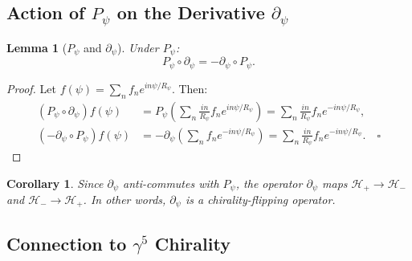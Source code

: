 \documentclass[12pt,a4paper]{article}
\newtheorem{lemma}[theorem]{Lemma}
\newtheorem{corollary}[theorem]{Corollary}
\theoremstyle{definition}
\theoremstyle{remark}
\begin{document}
\subsection{Action of $P_\psi$ on the Derivative $\partial_\psi$}
\label{subsec:derivative_action}

\begin{lemma}[$P_\psi$ and $\partial_\psi$]
\label{lem:psi_deriv}
Under $P_\psi$:
\begin{equation}
  P_\psi \circ \partial_\psi = -\partial_\psi \circ P_\psi.
\label{eq:parity_deriv}
\end{equation}
\end{lemma}

\begin{proof}
Let $f(\psi) = \sum_n f_n e^{in\psi/R_\psi}$.  Then:
\begin{align}
  (P_\psi \circ \partial_\psi)f(\psi)
  &= P_\psi\!\left(\sum_n \frac{in}{R_\psi} f_n e^{in\psi/R_\psi}\right)
  = \sum_n \frac{in}{R_\psi} f_n e^{-in\psi/R_\psi}, \\
  (-\partial_\psi \circ P_\psi)f(\psi)
  &= -\partial_\psi\!\left(\sum_n f_n e^{-in\psi/R_\psi}\right)
  = \sum_n \frac{in}{R_\psi} f_n e^{-in\psi/R_\psi}. \quad\square
\end{align}
\end{proof}

\begin{corollary}
Since $\partial_\psi$ anti-commutes with $P_\psi$, the operator $\partial_\psi$
maps $\mathcal{H}_+\to\mathcal{H}_-$ and $\mathcal{H}_-\to\mathcal{H}_+$.
In other words, $\partial_\psi$ is a chirality-\emph{flipping} operator.
\end{corollary}

\subsection{Connection to $\gamma^5$ Chirality}
\label{subsec:gamma5}
\end{document}
